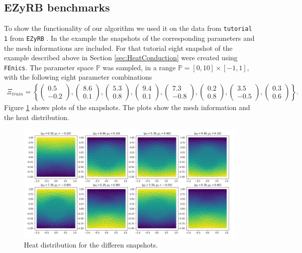 \newpage
\subsection{EZyRB benchmarks}
To show the functionality of our algorithm we used it on the data from \texttt{tutorial 1} from \texttt{EZyRB} \cite{demo18ezyrb}. In the example the snapshots of the corresponding parameters and the mesh informations are included. 
For that tutorial eight snapshot of the example described above in Section \ref{sec:HeatConduction} were created using \texttt{FEnics}.
The parameter space $\mathbb{P}$ was sampled, in a range $\mathbb{P} =  [0, 10] \times  [-1,1]$, with the following eight parameter combinations
\begin{align*}
\Xi_{train}=
\left\{
\begin{pmatrix} 0.5 \\ -0.2 \end{pmatrix},
\begin{pmatrix} 8.6 \\  0.1 \end{pmatrix},
\begin{pmatrix} 5.3 \\  0.8 \end{pmatrix},
\begin{pmatrix} 9.4 \\  0.1 \end{pmatrix},
\begin{pmatrix} 7.3 \\ -0.8 \end{pmatrix},
\begin{pmatrix} 0.2 \\  0.8 \end{pmatrix},
\begin{pmatrix} 3.5 \\ -0.5 \end{pmatrix},
\begin{pmatrix} 0.3 \\  0.6 \end{pmatrix}
\right\}.
\end{align*}
Figure \ref{fig:snaps} shows plots of the snapshots.
The plots show the mesh information and the heat distribution.
\begin{figure}[H]
	\centering
	\includegraphics[width=\textwidth]{images/snapshots}
	\caption[Snapshots]{Heat distribution for the differen snapshots. }
	\label{fig:snaps}
\end{figure}

